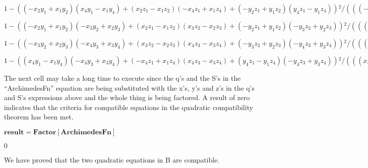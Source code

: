 \documentclass{article}
\begin{document}
\begin{doublespace}
\noindent\(1-\left(\left(-x_2 y_1+x_1 y_2\right) \left(x_4 y_1-x_1 y_4\right)+\left(x_2 z_1-x_1 z_2\right) \left(-x_4 z_1+x_1 z_4\right)+\left(-y_2
z_1+y_1 z_2\right) \left(y_4 z_1-y_1 z_4\right)\right){}^2/\left(\left(\left(-x_2 y_1+x_1 y_2\right){}^2+\left(x_2 z_1-x_1 z_2\right){}^2+\left(-y_2
z_1+y_1 z_2\right){}^2\right) \left(\left(x_4 y_1-x_1 y_4\right){}^2+\left(-x_4 z_1+x_1 z_4\right){}^2+\left(y_4 z_1-y_1 z_4\right){}^2\right)\right)\)
\end{doublespace}

\begin{doublespace}
\noindent\(1-\left(\left(-x_2 y_1+x_1 y_2\right) \left(-x_3 y_2+x_2 y_3\right)+\left(x_2 z_1-x_1 z_2\right) \left(x_3 z_2-x_2 z_3\right)+\left(-y_2
z_1+y_1 z_2\right) \left(-y_3 z_2+y_2 z_3\right)\right){}^2/\left(\left(\left(-x_2 y_1+x_1 y_2\right){}^2+\left(x_2 z_1-x_1 z_2\right){}^2+\left(-y_2
z_1+y_1 z_2\right){}^2\right) \left(\left(-x_3 y_2+x_2 y_3\right){}^2+\left(x_3 z_2-x_2 z_3\right){}^2+\left(-y_3 z_2+y_2 z_3\right){}^2\right)\right)\)
\end{doublespace}

\begin{doublespace}
\noindent\(1-\left(\left(-x_3 y_2+x_2 y_3\right) \left(-x_4 y_3+x_3 y_4\right)+\left(x_3 z_2-x_2 z_3\right) \left(x_4 z_3-x_3 z_4\right)+\left(-y_3
z_2+y_2 z_3\right) \left(-y_4 z_3+y_3 z_4\right)\right){}^2/\left(\left(\left(-x_3 y_2+x_2 y_3\right){}^2+\left(x_3 z_2-x_2 z_3\right){}^2+\left(-y_3
z_2+y_2 z_3\right){}^2\right) \left(\left(-x_4 y_3+x_3 y_4\right){}^2+\left(x_4 z_3-x_3 z_4\right){}^2+\left(-y_4 z_3+y_3 z_4\right){}^2\right)\right)\)
\end{doublespace}

\begin{doublespace}
\noindent\(1-\left(\left(x_4 y_1-x_1 y_4\right) \left(-x_4 y_3+x_3 y_4\right)+\left(-x_4 z_1+x_1 z_4\right) \left(x_4 z_3-x_3 z_4\right)+\left(y_4
z_1-y_1 z_4\right) \left(-y_4 z_3+y_3 z_4\right)\right){}^2/\left(\left(\left(x_4 y_1-x_1 y_4\right){}^2+\left(-x_4 z_1+x_1 z_4\right){}^2+\left(y_4
z_1-y_1 z_4\right){}^2\right) \left(\left(-x_4 y_3+x_3 y_4\right){}^2+\left(x_4 z_3-x_3 z_4\right){}^2+\left(-y_4 z_3+y_3 z_4\right){}^2\right)\right)\)
\end{doublespace}

The next cell may take a long time to execute since the q{'}s and the S{'}s in the {``}ArchimedesFn{''} equation are being substituted with the x{'}s,
y{'}s and z{'}s in the q{'}s and S{'}s expressions above and the whole thing is being factored. A result of zero indicates that the criteria for
compatible equations in the quadratic compatibility theorem has been met.

\begin{doublespace}
\noindent\(\pmb{\text{result} = \text{Factor}[\text{ArchimedesFn}]}\)
\end{doublespace}

\begin{doublespace}
\noindent\(0\)
\end{doublespace}

We have proved that the two quadratic equations in B are compatible.
\end{document}
